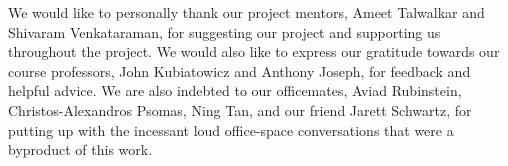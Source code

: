 %

We would like to personally thank our project mentors, Ameet Talwalkar and
Shivaram Venkataraman, for suggesting our project and supporting us
throughout the project. We would also like to express our gratitude 
towards our course professors,
John Kubiatowicz and Anthony Joseph, for feedback and helpful advice. 
We are also indebted to our officemates, 
Aviad Rubinstein, 
Christos-Alexandros Psomas,
Ning Tan,
and our friend Jarett Schwartz, 
for putting up with the incessant loud office-space conversations
that were a byproduct of this work.
